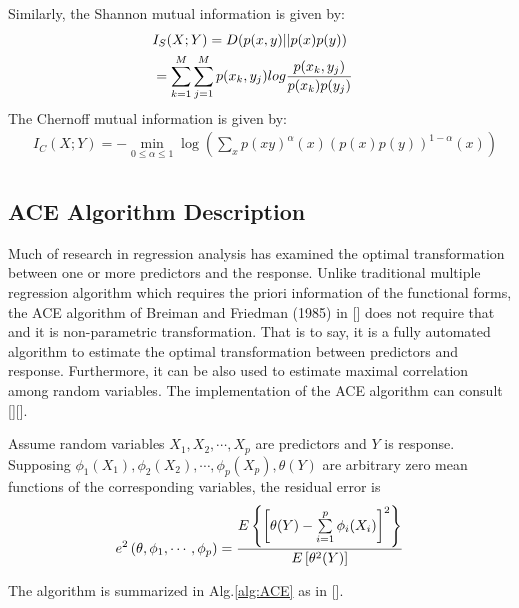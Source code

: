\documentclass[conference]{IEEEtran}
\begin{document}
 Similarly, the Shannon mutual information is given by:
 \begin{equation}\label{MSC Mutual information}
\begin{aligned}
 &  I_S(X;Y) = D(p(x,y)||p(x)p(y)) \cr
  &  = \sum\limits_{k = 1}^M {\sum\limits_{j = 1}^M {p({x_k},{y_j})log{{p({x_k},{y_j})} \over {p({x_k})p({y_j})}}} }   \cr
 \end{aligned}
\end{equation}
The Chernoff mutual information is given by:
\begin{equation}\label{MSC Chernoff information}
\begin{aligned}
 &I_C(X;Y)=- \mathop {\min }\limits_{0 \le \alpha  \le 1} \log \left( {\sum\limits_x {{p(xy)}^\alpha (x){(p(x)p(y))}^{1 - \alpha }(x)} } \right)\\
  \end{aligned}
\end{equation}

\subsection{ACE Algorithm Description}
 Much of research in regression analysis has examined the optimal transformation between one or more predictors and the response. Unlike traditional multiple regression algorithm which requires the priori information of the functional forms, the ACE algorithm of Breiman and Friedman (1985) in [\cite{breiman1985estimating}] does not require that and it is non-parametric transformation. That is to say, it is a fully automated algorithm to estimate the optimal transformation between predictors and response. Furthermore, it can be also used to estimate maximal correlation among random variables. The implementation of the ACE algorithm can consult [\cite{breiman1985estimating}][\cite{wang2004estimating}].

Assume random variables $X_1,X_2,\cdots ,X_p$ are predictors and $Y$ is response. Supposing $\phi _1(X_1),\phi _2(X_2),\cdots,\phi _p(X_p),\theta (Y)$ are arbitrary zero mean functions of the corresponding variables, the residual error is
\begin{equation}
{e^2}\left( {\theta ,{\phi _1},\cdots,{\phi _p}} \right) = {{E\left\{ {{{\left[ {\theta (Y) - \sum\limits_{i = 1}^p {{\phi _i}({X_i})} } \right]}^2}} \right\}} \over {E\left[ {{\theta ^2}(Y)} \right]}}
\end{equation}

\par The algorithm is summarized in Alg.\ref{alg:ACE} as in [\cite{breiman1985estimating}].
\end{document}

